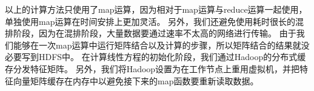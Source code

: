 以上的计算方法只使用了map运算，因为相对于map运算与reduce运算一起使用，单独使用map运算在时间安排上更加灵活。
另外，我们还避免使用耗时很长的混排阶段，因为在混排阶段，大量数据要通过速率不太高的网络进行传输。
由于我们能够在一次map运算中运行矩阵结合以及计算的步骤，所以矩阵结合的结果就没必要写到HDFS中。
在计算线性方程的初始化阶段，我们通过Hadoop的分布式缓存分发特征矩阵。
另外，我们将Hadoop设置为在工作节点上重用虚拟机，并把特征向量矩阵缓存在内存中以避免接下来的map函数要重新读取数据。


